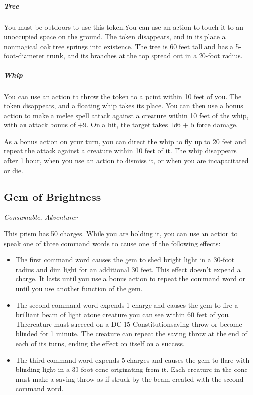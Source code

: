 \subparagraph*{Tree} You must be outdoors to use this token.You can use an action to touch it to an unoccupied space on the ground. The token disappears, and in its place a nonmagical oak tree springs into existence. The tree is 60 feet tall and has a 5-foot-diameter trunk, and its branches at the top spread out in a 20-foot radius.

\subparagraph*{Whip} You can use an action to throw the token to a point within 10 feet of you. The token disappears, and a floating whip takes its place. You can then use a bonus action to make a melee spell attack against a creature within 10 feet of the whip, with an attack bonus of +9. On a hit, the target takes 1d6 + 5 force damage.

As a bonus action on your turn, you can direct the whip to fly up to 20 feet and repeat the attack against a creature within 10 feet of it. The whip disappears after 1 hour, when you use an action to dismiss it, or when you are incapacitated or die.

\subsection{Gem of Brightness}
\textit{Consumable, Adventurer}

This prism has 50 charges. While you are holding it, you can use an action to speak one of three command words to cause one of the following effects:
\begin{itemize}
\item The first command word causes the gem to shed bright light in a 30-foot radius and dim light for an additional 30 feet. This effect doesn't expend a charge. It lasts until you use a bonus action to repeat the command word or until you use another function of the gem.
\item The second command word expends 1 charge and causes the gem to fire a brilliant beam of light atone creature you can see within 60 feet of you. Thecreature must succeed on a DC 15 Constitutionsaving throw or become blinded for 1 minute. The creature can repeat the saving throw at the end of each of its turns, ending the effect on itself on a success.
\item The third command word expends 5 charges and causes the gem to flare with blinding light in a 30-foot cone originating from it. Each creature in the cone must make a saving throw as if struck by the beam created with the second command word.
\end{itemize}

